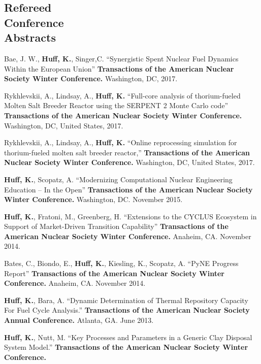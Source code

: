 \documentclass[margin,line]{resume}
\begin{document}
\begin{resume}
    \section{\mysidestyle Refereed\\Conference\\Abstracts}
    \begin{bibenum}
    \item Bae, J. W., \textbf{Huff, K.}, Singer,C. ``Synergistic Spent Nuclear Fuel Dynamics Within the European Union'' 
            \textbf{Transactions of the American Nuclear Society Winter Conference.} 
            Washington, DC, 2017.  
    \item Rykhlevskii, A., Lindsay, A., \textbf{Huff, K.} ``Full-core analysis of thorium-fueled Molten Salt Breeder Reactor using the SERPENT 2 Monte Carlo code'' 
            \textbf{Transactions of the American Nuclear Society Winter Conference.} 
            Washington, DC, United States, 2017.
    \item Rykhlevskii, A., Lindsay, A., \textbf{Huff, K.} ``Online reprocessing simulation for thorium-fueled molten salt breeder reactor,'' 
            \textbf{Transactions of the American Nuclear Society Winter Conference.} 
            Washington, DC, United States, 2017.
      \item \textbf{Huff, K.}, Scopatz, A. ``Modernizing Computational Nuclear Engineering Education -- In the Open''
         \textbf{Transactions of the American Nuclear Society Winter Conference.}
         Washington, DC. November 2015.
      \item \textbf{Huff, K.}, Fratoni, M., Greenberg, H. ``Extensions to the CYCLUS Ecosystem in Support of Market-Driven Transition Capability''
         \textbf{Transactions of the American Nuclear Society Winter Conference.}
         Anaheim, CA. November 2014.
      \item Bates, C., Biondo, E., \textbf{Huff, K.}, Kiesling, K., Scopatz, A. ``PyNE Progress Report''
         \textbf{Transactions of the American Nuclear Society Winter Conference.}
         Anaheim, CA. November 2014.
      \item \textbf{Huff, K.}, Bara, A. ``Dynamic Determination of Thermal Repository Capacity For Fuel Cycle Analysis.''
         \textbf{Transactions of the American Nuclear Society Annual Conference.}
         Atlanta, GA. June 2013.
      \item \textbf{Huff, K.}, Nutt, M. ``Key Processes and Parameters in a Generic Clay Disposal System Model.''
         \textbf{Transactions of the American Nuclear Society Winter Conference.}

\end{bibenum}
\end{resume}
\end{document}

